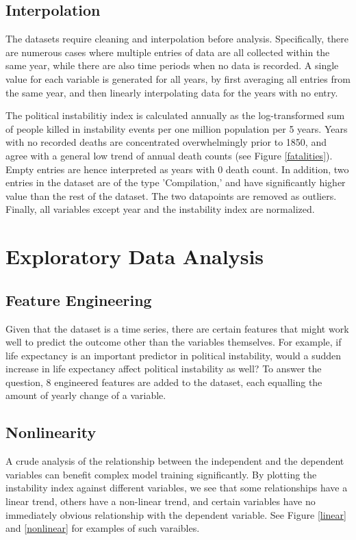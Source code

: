 \documentclass[twocolumn]{article}
\begin{document}
\subsection{Interpolation}
The datasets require cleaning and interpolation before analysis. Specifically, there are numerous cases where multiple entries of data are all collected within the same year, while there are also time periods when no data is recorded. A single value for each variable is generated for all years, by first averaging all entries from the same year, and then linearly interpolating data for the years with no entry.

The political instabilitiy index is calculated annually as the log-transformed sum of people killed in instability events per one million population per 5 years. Years with no recorded deaths are concentrated overwhelmingly prior to 1850, and agree with a general low trend of annual death counts (see Figure \ref{fatalities}). Empty entries are hence interpreted as years with 0 death count. In addition, two entries in the dataset are of the type 'Compilation,' and have significantly higher value than the rest of the dataset. The two datapoints are removed as outliers. Finally, all variables except year and the instability index are normalized.


\section{Exploratory Data Analysis}
\subsection{Feature Engineering}
Given that the dataset is a time series, there are certain features that might work well to predict the outcome other than the variables themselves. For example, if life expectancy is an important predictor in political instability, would a sudden increase in life expectancy affect political instability as well? To answer the question, 8 engineered features are added to the dataset, each equalling the amount of yearly change of a variable.

\subsection{Nonlinearity}
A crude analysis of the relationship between the independent and the dependent variables can benefit complex model training significantly. By plotting the instability index against different variables, we see that some relationships have a linear trend, others have a non-linear trend, and certain variables have no immediately obvious relationship with the dependent variable. See Figure \ref{linear} and \ref{nonlinear} for examples of such varaibles.
\end{document}
